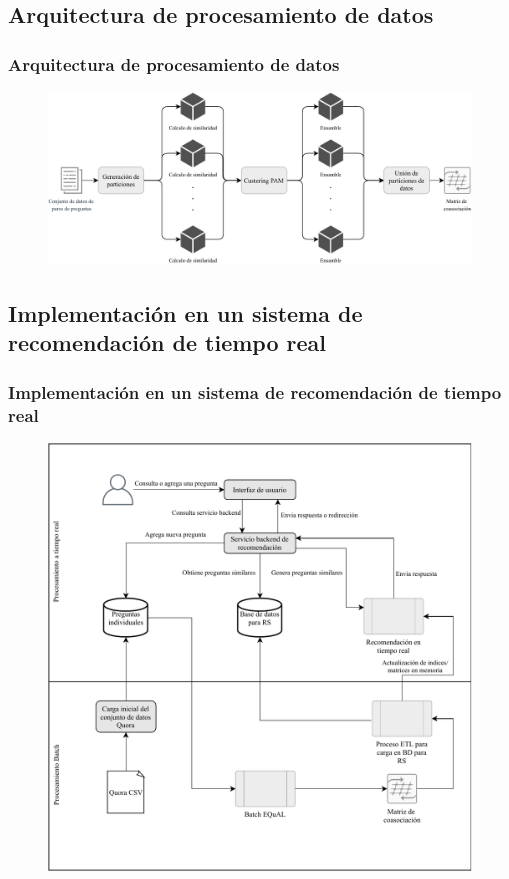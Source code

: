 \subsection{Arquitectura de procesamiento de datos}
\begin{frame}
	\frametitle{Arquitectura de procesamiento de datos}
	\begin{figure}
		\centering
		\includegraphics[width=0.9\linewidth]{../8_problema_investigacion/imagenes/equal_distribuido}
		\label{fig:equaldistribuido}
	\end{figure}
\end{frame}

\subsection{Implementación en un sistema de recomendación de tiempo real}
\begin{frame}
	\frametitle{Implementación en un sistema de recomendación de tiempo real}
	\begin{figure}
		\centering
		\includegraphics[width=0.55\linewidth]{../8_problema_investigacion/imagenes/implementacion_rs}
		\label{fig:implementacionrs}
	\end{figure}
\end{frame}

